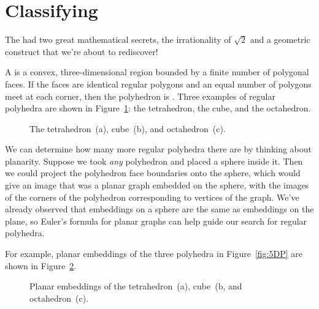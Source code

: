 \section{Classifying }

The  had two great mathematical secrets, the
irrationality of $\sqrt{2}$ and a geometric construct that we're about
to rediscover!

A  is a convex, three-dimensional region bounded by a
finite number of polygonal faces.  If the faces are identical regular
polygons and an equal number of polygons meet at each corner, then the
polyhedron is .  Three
examples of regular polyhedra are shown in Figure~\ref{fig:polyhedra}: the
tetrahedron, the cube, and the octahedron.

\begin{figure}

\quad
{}
\quad
{}

\caption{The tetrahedron~(a), cube~(b), and octahedron~(c).}

\label{fig:polyhedra}
\end{figure}

We can determine how many more regular polyhedra there are by thinking
about planarity.  Suppose we took \emph{any} polyhedron and placed a
sphere inside it.  Then we could project the polyhedron face
boundaries onto the sphere, which would give an image that was a
planar graph embedded on the sphere, with the images of the corners of
the polyhedron corresponding to vertices of the graph.  We've already
observed that embeddings on a sphere are the same as embeddings on the
plane, so Euler's formula for planar graphs can help guide our search
for regular polyhedra.

For example, planar embeddings of the three polyhedra in
Figure~\ref{fig:5DP} are shown in Figure~\ref{fig:5DQ}.

\begin{figure}

\quad
{}
\quad
{}

\caption{Planar embeddings of the tetrahedron~(a), cube~(b, and
  octahedron~(c).}

\label{fig:5DQ}

\end{figure}

